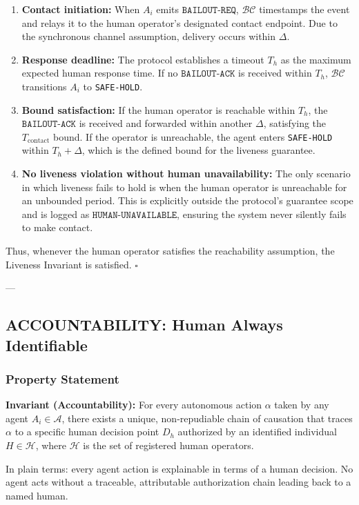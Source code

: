 \begin{enumerate}
    \item \textbf{Contact initiation:} When $A_i$ emits $\texttt{BAILOUT-REQ}$, $\mathcal{BC}$ timestamps the event and relays it to the human operator's designated contact endpoint. Due to the synchronous channel assumption, delivery occurs within $\Delta$.
    \item \textbf{Response deadline:} The protocol establishes a timeout $T_h$ as the maximum expected human response time. If no $\texttt{BAILOUT-ACK}$ is received within $T_h$, $\mathcal{BC}$ transitions $A_i$ to \texttt{SAFE-HOLD}.
    \item \textbf{Bound satisfaction:} If the human operator is reachable within $T_h$, the $\texttt{BAILOUT-ACK}$ is received and forwarded within another $\Delta$, satisfying the $T_{\text{contact}}$ bound. If the operator is unreachable, the agent enters \texttt{SAFE-HOLD} within $T_h + \Delta$, which is the defined bound for the liveness guarantee.
    \item \textbf{No liveness violation without human unavailability:} The only scenario in which liveness fails to hold is when the human operator is unreachable for an unbounded period. This is explicitly outside the protocol's guarantee scope and is logged as $\texttt{HUMAN-UNAVAILABLE}$, ensuring the system never silently fails to make contact.
\end{enumerate}

Thus, whenever the human operator satisfies the reachability assumption, the Liveness Invariant is satisfied. $\square$

---

\subsection{ACCOUNTABILITY: Human Always Identifiable}

\subsubsection{Property Statement}
\textbf{Invariant (Accountability):} For every autonomous action $\alpha$ taken by any agent $A_i \in \mathcal{A}$, there exists a unique, non-repudiable chain of causation that traces $\alpha$ to a specific human decision point $D_h$ authorized by an identified individual $H \in \mathcal{H}$, where $\mathcal{H}$ is the set of registered human operators.

In plain terms: every agent action is explainable in terms of a human decision. No agent acts without a traceable, attributable authorization chain leading back to a named human.


